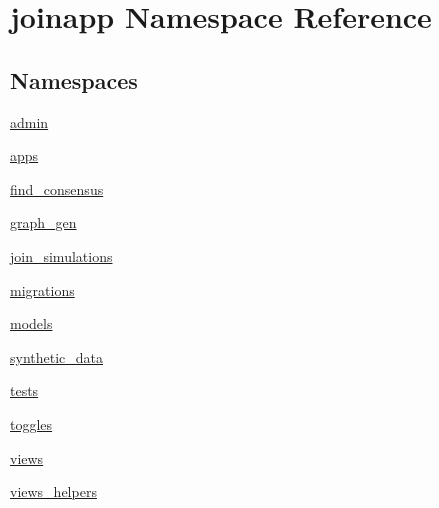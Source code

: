 \hypertarget{namespacejoinapp}{}\section{joinapp Namespace Reference}
\label{namespacejoinapp}
\subsection*{Namespaces}
\begin{DoxyCompactItemize}
\item 
 \mbox{\hyperlink{namespacejoinapp_1_1admin}{admin}}
\item 
 \mbox{\hyperlink{namespacejoinapp_1_1apps}{apps}}
\item 
 \mbox{\hyperlink{namespacejoinapp_1_1find__consensus}{find\+\_\+consensus}}
\item 
 \mbox{\hyperlink{namespacejoinapp_1_1graph__gen}{graph\+\_\+gen}}
\item 
 \mbox{\hyperlink{namespacejoinapp_1_1join__simulations}{join\+\_\+simulations}}
\item 
 \mbox{\hyperlink{namespacejoinapp_1_1migrations}{migrations}}
\item 
 \mbox{\hyperlink{namespacejoinapp_1_1models}{models}}
\item 
 \mbox{\hyperlink{namespacejoinapp_1_1synthetic__data}{synthetic\+\_\+data}}
\item 
 \mbox{\hyperlink{namespacejoinapp_1_1tests}{tests}}
\item 
 \mbox{\hyperlink{namespacejoinapp_1_1toggles}{toggles}}
\item 
 \mbox{\hyperlink{namespacejoinapp_1_1views}{views}}
\item 
 \mbox{\hyperlink{namespacejoinapp_1_1views__helpers}{views\+\_\+helpers}}
\end{DoxyCompactItemize}
